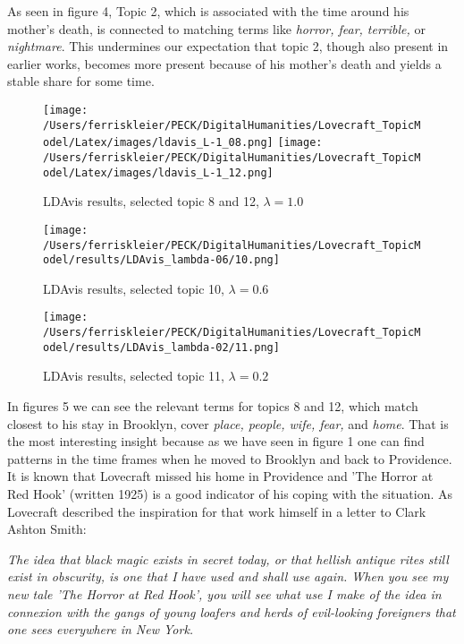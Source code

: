 As seen in figure 4, Topic 2, which is associated with the time around his mother’s death, is 
connected to matching terms like \textit{horror, fear, terrible,} or \textit{nightmare}. This undermines our expectation 
that topic 2, though also present in earlier works, becomes more present because of his mother's death 
and yields a stable share for some time.\\

\begin{figure}[p]
    \centering
    \texttt{[image: /Users/ferriskleier/PECK/DigitalHumanities/Lovecraft\_TopicModel/Latex/images/ldavis\_L-1\_08.png]}
    \texttt{[image: /Users/ferriskleier/PECK/DigitalHumanities/Lovecraft\_TopicModel/Latex/images/ldavis\_L-1\_12.png]}
    \caption{LDAvis results, selected topic 8 and 12, $\lambda=1.0$}
    \label{fig:mesh5}
\end{figure}

\begin{figure}[p]
    \centering
    \texttt{[image: /Users/ferriskleier/PECK/DigitalHumanities/Lovecraft\_TopicModel/results/LDAvis\_lambda-06/10.png]}
    \caption{LDAvis results, selected topic 10, $\lambda=0.6$}
    \label{fig:mesh6}
\end{figure}

\begin{figure}[ht]
    \centering
    \texttt{[image: /Users/ferriskleier/PECK/DigitalHumanities/Lovecraft\_TopicModel/results/LDAvis\_lambda-02/11.png]}
    \caption{LDAvis results, selected topic 11, $\lambda=0.2$}
    \label{fig:mesh7}
\end{figure}

In figures 5 we can see the relevant terms for topics 8 and 12, which match closest to his stay 
in Brooklyn, cover \textit{place, people, wife, fear,} and \textit{home}. That is the most interesting insight because 
as we have seen in figure 1 one can find patterns in the time frames when he moved to Brooklyn and 
back to Providence. It is known that Lovecraft missed his home in Providence and 'The Horror at 
Red Hook' (written 1925) is a good indicator of his coping with the situation. As Lovecraft 
described the inspiration for that work himself in a letter to Clark Ashton Smith:

\begin{displayquote}
    \textit{The idea that black magic exists in secret today, or that hellish antique rites still 
    exist in obscurity, is one that I have used and shall use again. When you see my new tale 
    'The Horror at Red Hook', you will see what use I make of the idea in connexion with the 
    gangs of young loafers and herds of evil-looking foreigners that one sees everywhere in 
    New York.} \cite{letter}
\end{displayquote}

